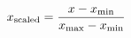 \documentclass[preview]{standalone}
\begin{document}
\begin{align*}
\special{dvisvgm:raw <g id='unique000'>}x_{\text{scaled}} = \frac{x - x_{\min}}{x_{\max} - x_{\min}}\special{dvisvgm:raw </g>}
\end{align*}
\end{document}
